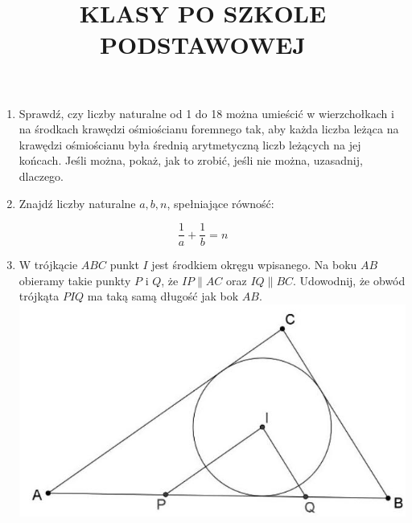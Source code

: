 \documentclass[10pt]{article}
\title{KLASY PO SZKOLE PODSTAWOWEJ }
\author{}
\date{}
\begin{document}
\maketitle
\begin{enumerate}
  \item Sprawdź, czy liczby naturalne od 1 do 18 można umieścić w wierzchołkach i na środkach krawędzi ośmiościanu foremnego tak, aby każda liczba leżąca na krawędzi ośmiościanu była średnią arytmetyczną liczb leżących na jej końcach. Jeśli można, pokaż, jak to zrobić, jeśli nie można, uzasadnij, dlaczego.
  \item Znajdź liczby naturalne \(a, b, n\), spełniające równość:
\end{enumerate}

\[
\frac{1}{a}+\frac{1}{b}=n
\]

\begin{enumerate}
  \setcounter{enumi}{2}
  \item W trójkącie \(A B C\) punkt \(I\) jest środkiem okręgu wpisanego. Na boku \(A B\) obieramy takie punkty \(P\) i \(Q\), że \(I P \| A C\) oraz \(I Q \| B C\). Udowodnij, że obwód trójkąta \(P I Q\) ma taką samą długość jak bok \(A B\).\\
\includegraphics[max width=\textwidth, center]{2024_11_21_7df58923022be014b7d0g-1(1)}
\end{enumerate}
\end{document}
